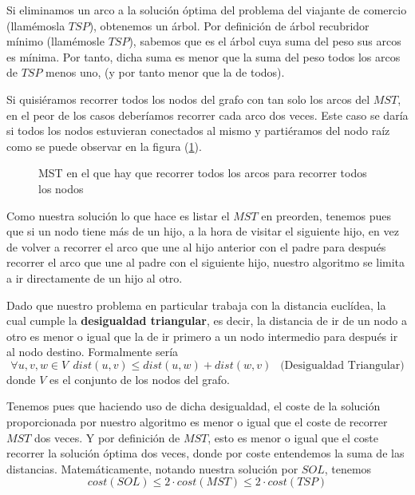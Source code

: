 \documentclass{article}
\begin{document}
Si eliminamos un arco a la solución óptima del problema del viajante de comercio (llamémosla $TSP$), obtenemos un árbol.
Por definición de árbol recubridor mínimo (llamémosle $TSP$), sabemos que es el árbol cuya suma del peso sus arcos es mínima. Por tanto, dicha suma es menor que la suma del peso todos los arcos de $TSP$ menos uno, (y por tanto menor que la de todos).

Si quisiéramos recorrer todos los nodos del grafo con tan solo los arcos del $MST$, en el peor de los casos deberíamos recorrer cada arco dos veces. Este caso se daría si todos los nodos estuvieran conectados al mismo y partiéramos del nodo raíz como se puede observar en la figura (\ref{fig:grafo}).

\begin{figure}[hbt!]
    \centering
    \caption{MST en el que hay que recorrer todos los arcos para recorrer todos los nodos}
    \label{fig:grafo}
\end{figure}

Como nuestra solución lo que hace es listar el $MST$ en preorden, tenemos pues que si un nodo tiene más de un hijo, a la hora de visitar el siguiente hijo, en vez de volver a recorrer el arco que une al hijo anterior con el padre para después recorrer el arco que une al padre con el siguiente hijo, nuestro algoritmo se limita a ir directamente de un hijo al otro.

Dado que nuestro problema en particular trabaja con la distancia euclídea, la cual cumple la \textbf{desigualdad triangular}, es decir, la distancia de ir de un nodo a otro es menor o igual que la de ir primero a un nodo intermedio para después ir al nodo destino. Formalmente sería
$$\forall u,v,w \in V \:\: dist(u,v) \leq dist(u,w) + dist(w,v) \:\: \text{  (Desigualdad Triangular)}$$ donde $V$ es el conjunto de los nodos del grafo.

Tenemos pues que haciendo uso de dicha desigualdad, el coste de la solución proporcionada por nuestro algoritmo es menor o igual que el coste de recorrer $MST$ dos veces. Y por definición de $MST$, esto es menor o igual que el coste recorrer la solución óptima dos veces, donde por coste entendemos la suma de las distancias. Matemáticamente, notando nuestra solución por $SOL$, tenemos
$$cost(SOL) \leq 2 \cdot cost(MST) \leq 2 \cdot cost(TSP)$$
\end{document}
